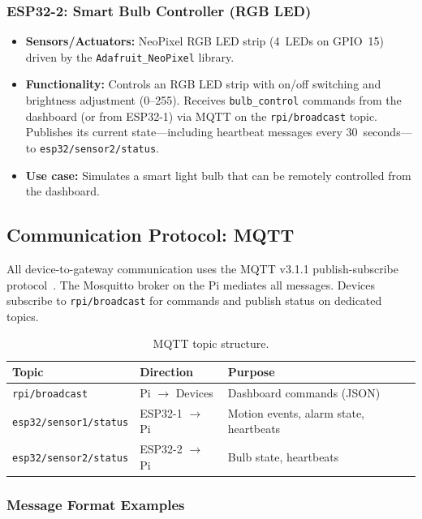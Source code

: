 \documentclass[12pt,a4paper]{article}
\begin{document}
\subsubsection*{ESP32-2: Smart Bulb Controller (RGB LED)}
\begin{itemize}
    \item \textbf{Sensors/Actuators:} NeoPixel RGB LED strip (4~LEDs on GPIO~15) driven by the \texttt{Adafruit\_NeoPixel} library.
    \item \textbf{Functionality:} Controls an RGB LED strip with on/off switching and brightness adjustment (0--255). Receives \texttt{bulb\_control} commands from the dashboard (or from ESP32-1) via MQTT on the \texttt{rpi/broadcast} topic. Publishes its current state---including heartbeat messages every 30~seconds---to \texttt{esp32/sensor2/status}.
    \item \textbf{Use case:} Simulates a smart light bulb that can be remotely controlled from the dashboard.
\end{itemize}

\subsection{Communication Protocol: MQTT}
\label{sec:mqtt}

All device-to-gateway communication uses the MQTT v3.1.1 publish-subscribe protocol~\cite{banks2014mqtt}. The Mosquitto broker on the Pi mediates all messages. Devices subscribe to \texttt{rpi/broadcast} for commands and publish status on dedicated topics.

\begin{table}[H]
\centering
\caption{MQTT topic structure.}
\label{tab:mqtt_topics}
\begin{tabular}{llp{5.5cm}}
\toprule
\textbf{Topic} & \textbf{Direction} & \textbf{Purpose} \\
\midrule
\texttt{rpi/broadcast}         & Pi $\rightarrow$ Devices & Dashboard commands (JSON) \\
\texttt{esp32/sensor1/status}  & ESP32-1 $\rightarrow$ Pi & Motion events, alarm state, heartbeats \\
\texttt{esp32/sensor2/status}  & ESP32-2 $\rightarrow$ Pi & Bulb state, heartbeats \\
\bottomrule
\end{tabular}
\end{table}

\subsubsection*{Message Format Examples}
\end{document}
